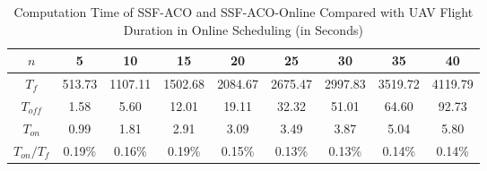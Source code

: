 \begin{metaresponse}
	\begin{table}[h]
		\renewcommand{\arraystretch}{1.2}
		\centering
		\caption{Computation Time of SSF-ACO and SSF-ACO-Online Compared with UAV Flight Duration in Online Scheduling (in Seconds)}
		\label{meta:tb:runtime}
		\centering
		\begin{tabular}{*{9}{c}}
			\hline
			$n$ & 5 & 10 & 15 & 20 & 25 & 30 & 35 & 40 \\
			\hline
			$T_f$ & 513.73 & 1107.11 & 1502.68 & 2084.67 & 2675.47 & 2997.83 & 3519.72 & 4119.79 \\
			$T_{off}$ & 1.58 & 5.60 & 12.01 & 19.11 & 32.32 & 51.01 & 64.60 & 92.73 \\
			$T_{on}$ & 0.99 & 1.81 & 2.91 & 3.09 & 3.49 & 3.87 & 5.04 & 5.80 \\
			$T_{on} / T_f$ & 0.19\% & 0.16\% & 0.19\% & 0.15\% & 0.13\% & 0.13\% & 0.14\% & 0.14\% \\
			\hline
		\end{tabular}
	\end{table}

\end{metaresponse}

